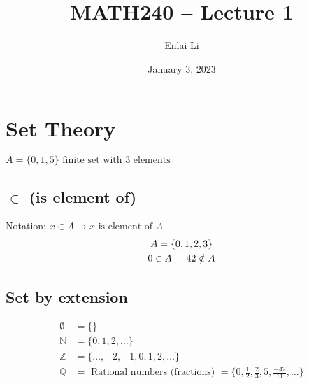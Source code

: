 \documentclass{article}
\author{Enlai Li}
\title{MATH240 -- Lecture 1}
\date{January 3, 2023}
\begin{document}
\maketitle
\section{Set Theory}
$A = \{0, 1, 5\} \text{ finite set with 3 elements}$

\subsection{$\in$ (is element of)}
Notation: $x \in A \rightarrow x \text{ is element of } A$
\begin{gather*}
    A = \{0,1,2,3\} \\
    0 \in A \text{\indent } 42 \notin A
\end{gather*}

\subsection{Set by extension}
\begin{align*}
    \emptyset  & = \{\}                                                                  \\
    \mathbb{N} & = \{0,1,2,\ldots\}                                                      \\
    \mathbb{Z} & = \{\ldots,-2,-1,0,1,2,\ldots\}                                         \\
    \mathbb{Q} & = \text{ Rational numbers (fractions) } = \{0, \frac{1}{2}, \frac{2}{3}
    , 5, \frac{-42}{11}, \ldots\}
\end{align*}
\end{document}
